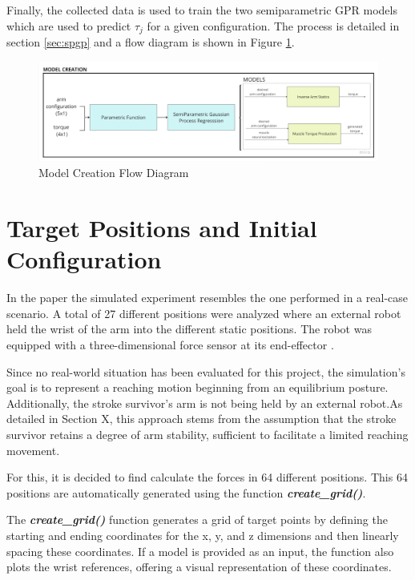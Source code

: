 Finally, the collected data is used to train the two semiparametric GPR models which are used to predict $\tau_j$ for a given configuration. The process is detailed in section \ref{sec:spgp} and a flow diagram is shown in Figure \ref{fig:modelcreation}.

\begin{figure}[h!]
    \centering
    \includegraphics[width=1\textwidth]{Pictures/Model/ModelCreation.jpg}
    \caption{Model Creation Flow Diagram}
    \label{fig:modelcreation}
\end{figure}

 \section{Target Positions and Initial Configuration} \label{sec:tp}

 In the paper \cite{QSC} the simulated experiment resembles the one performed in a real-case scenario. A total of 27 different positions were analyzed where an external robot held the wrist of the arm into the different static positions. The robot was equipped with a three-dimensional force sensor at its end-effector \cite{HSAC}. 
 
 Since no real-world situation has been evaluated for this project, the simulation's goal is to represent a reaching motion beginning from an equilibrium posture. Additionally, the stroke survivor's arm is not being held by an external robot.As detailed in Section X, this approach stems from the assumption that the stroke survivor retains a degree of arm stability, sufficient to facilitate a limited reaching movement.  

 For this, it is decided to find calculate the forces in 64 different positions. This 64 positions are automatically generated using the function \textit{\textbf{create\_grid()}}.


The \textbf{\textit{create\_grid()}} function generates a grid of target points by defining the starting and ending coordinates for the x, y, and z dimensions and then linearly spacing these coordinates. If a model is provided as an input, the function also plots the wrist references, offering a visual representation of these coordinates.

